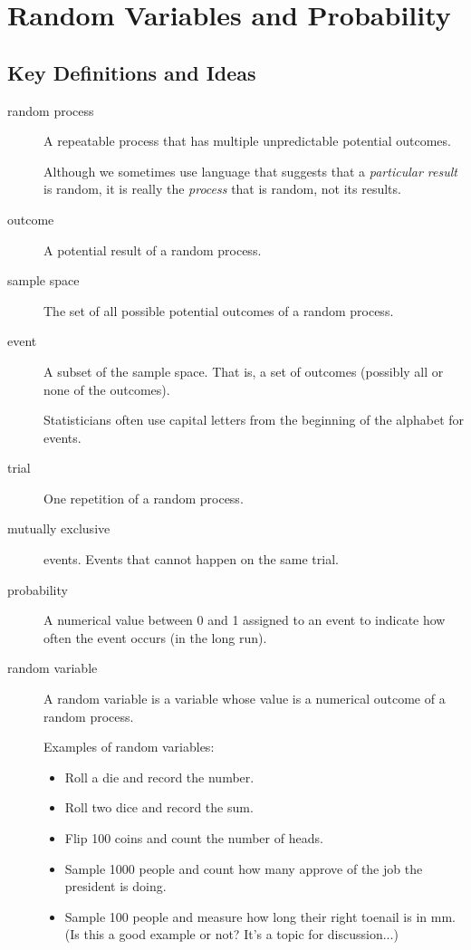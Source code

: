 \documentclass[twoside]{book}\usepackage[]{graphicx}\usepackage[]{xcolor}
\def\Chapter#1{%
\chapter{#1}
}
\newcounter{example}[section]
\newif\ifsolutions
\newif\ifsolutionslocal
\begin{document}
\shipoutProblems

\ifsolutions
\ifsolutionslocal
\newpage
\section*{Solutions}
\shipoutSolutions
\fi
\fi




\Chapter{Random Variables and Probability}

\section{Key Definitions and Ideas}

\begin{description}
\item[random process]
A repeatable process that has multiple unpredictable potential outcomes.

Although we sometimes use language that suggests that a \emph{particular result} is 
random, it is really the \emph{process} that is random, not its results.

\item[outcome]
A potential result of a random process.

\item[sample space]
The set of all possible potential outcomes of a random process.

\item[event]
A subset of the sample space.  
That is, a set of outcomes (possibly all or none of the outcomes).

Statisticians often use capital letters from the beginning of the alphabet
for events.

\item[trial] One repetition of a random process.

\item[mutually exclusive] events.
Events that cannot happen on the same trial.

\item[probability] A numerical value between 0 and 1 assigned to 
an event to indicate how often the event occurs (in the long run).

\item[random variable]
A random variable is a variable whose value is a numerical outcome of a random process.

Examples of random variables: 
\begin{itemize}
\item
Roll a die and record the number.
\item
Roll two dice and record the sum.
\item
Flip 100 coins and count the number of heads.
\item
Sample 1000 people and count how many approve of the job the president is doing.
\item Sample 100 people and measure how long their right toenail is in mm. (Is this a good example or not?  It's a topic for discussion...)
\end{itemize}


\end{description}
\end{document}
